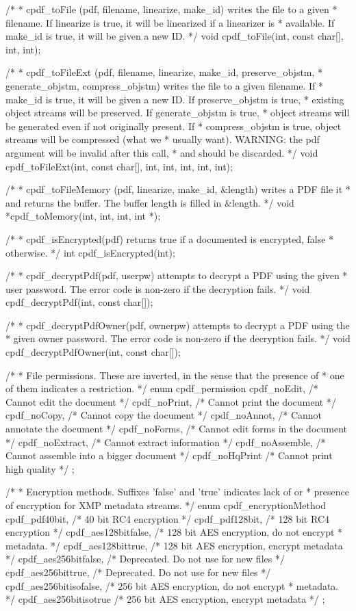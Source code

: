 /*
 * cpdf_toFile (pdf, filename, linearize, make_id) writes the file to a given
 * filename. If linearize is true, it will be linearized if a linearizer is
 * available. If make_id is true, it will be given a new ID.
 */
void cpdf_toFile(int, const char[], int, int);

/*
 * cpdf_toFileExt (pdf, filename, linearize, make_id, preserve_objstm,
 * generate_objstm, compress_objstm) writes the file to a given filename. If
 * make_id is true, it will be given a new ID.  If preserve_objstm is true,
 * existing object streams will be preserved. If generate_objstm is true,
 * object streams will be generated even if not originally present. If
 * compress_objstm is true, object streams will be compressed (what we
 * usually want). WARNING: the pdf argument will be invalid after this call,
 * and should be discarded.
 */
void cpdf_toFileExt(int, const char[], int, int, int, int, int);

/*
 * cpdf_toFileMemory (pdf, linearize, make_id, &length) writes a PDF file it
 * and returns the buffer. The buffer length is filled in &length.
 */
void *cpdf_toMemory(int, int, int, int *);

/*
 * cpdf_isEncrypted(pdf) returns true if a documented is encrypted, false
 * otherwise.
 */
int cpdf_isEncrypted(int);

/*
 * cpdf_decryptPdf(pdf, userpw) attempts to decrypt a PDF using the given
 * user password. The error code is non-zero if the decryption fails.
 */
void cpdf_decryptPdf(int, const char[]);

/*
 * cpdf_decryptPdfOwner(pdf, ownerpw) attempts to decrypt a PDF using the
 * given owner password. The error code is non-zero if the decryption fails.
 */
void cpdf_decryptPdfOwner(int, const char[]);

/*
 * File permissions. These are inverted, in the sense that the presence of
 * one of them indicates a restriction.
 */
enum cpdf_permission {
  cpdf_noEdit,     /* Cannot edit the document */
  cpdf_noPrint,    /* Cannot print the document */
  cpdf_noCopy,     /* Cannot copy the document */
  cpdf_noAnnot,    /* Cannot annotate the document */
  cpdf_noForms,    /* Cannot edit forms in the document */
  cpdf_noExtract,  /* Cannot extract information */
  cpdf_noAssemble, /* Cannot assemble into a bigger document */
  cpdf_noHqPrint   /* Cannot print high quality */
};

/*
 * Encryption methods. Suffixes 'false' and 'true' indicates lack of or
 * presence of encryption for XMP metadata streams.
 */
enum cpdf_encryptionMethod {
  cpdf_pdf40bit,          /* 40 bit RC4 encryption */
  cpdf_pdf128bit,         /* 128 bit RC4 encryption */
  cpdf_aes128bitfalse,    /* 128 bit AES encryption, do not encrypt
                           * metadata. */
  cpdf_aes128bittrue,     /* 128 bit AES encryption, encrypt metadata */
  cpdf_aes256bitfalse,    /* Deprecated. Do not use for new files */
  cpdf_aes256bittrue,     /* Deprecated. Do not use for new files */
  cpdf_aes256bitisofalse, /* 256 bit AES encryption, do not encrypt
                           * metadata. */
  cpdf_aes256bitisotrue   /* 256 bit AES encryption, encrypt metadata */
};

